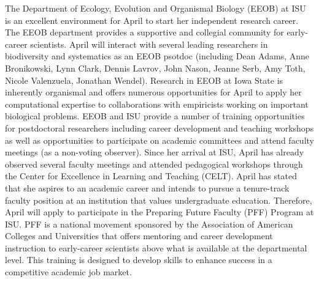 \documentclass[11pt]{article}
\begin{document}
The Department of Ecology, Evolution and Organismal Biology (EEOB) at ISU is an excellent environment for April to start her independent research career. 
The EEOB department provides a supportive and collegial community for early-career scientists.
April will interact with several leading researchers in biodiversity and systematics as an EEOB psotdoc (including Dean Adams, Anne Bronikowski, Lynn Clark, Dennis Lavrov, John Nason, Jeanne Serb, Amy Toth, Nicole Valenzuela, Jonathan Wendel). 
Research in EEOB at Iowa State is inherently organismal and offers numerous opportunities for April to apply her computational expertise to collaborations with empiricists working on important biological problems.
EEOB and ISU provide a number of training opportunities for postdoctoral researchers including career development and teaching workshops as well as opportunities to participate on academic committees and attend faculty meetings (as a non-voting observer). 
Since her arrival at ISU, April has already observed several faculty meetings and attended pedagogical workshops through the Center for Excellence in Learning and Teaching (CELT).
April has stated that she aspires to an academic career and intends to pursue a tenure-track faculty position at an institution that values undergraduate education.
Therefore, April will apply to participate in the Preparing Future Faculty (PFF) Program at ISU. PFF is a national movement sponsored by the Association of American Colleges and Universities that offers mentoring and career development instruction to early-career scientists above what is available at the departmental level. This training is designed to develop skills to enhance success in a competitive academic job market.
\end{document}
